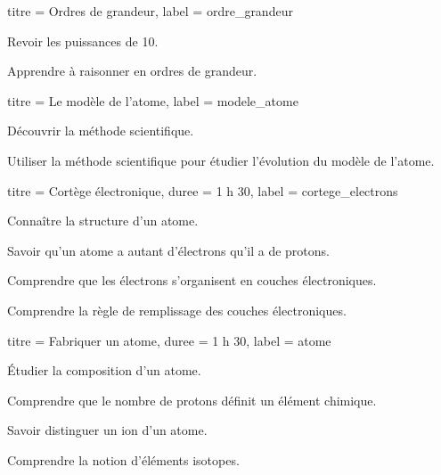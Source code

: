 \begin{boiteCodeTex}{}
  \setcounter{activiteNum}{0}
  \setcounter{TPNum}{0}
  \begin{multicols}{2}
    \begin{activite}{titre = Ordres de grandeur, label = ordre_grandeur}
      \begin{objectifs}  
        \item Revoir les puissances de 10.
        \item Apprendre à raisonner en ordres de grandeur.
      \end{objectifs}
    \end{activite}
    \begin{TP}{titre = Le modèle de l'atome, label = modele_atome}
      \begin{objectifs}
          \item Découvrir la méthode scientifique.
          \item Utiliser la méthode scientifique pour étudier l'évolution du modèle de l'atome.
      \end{objectifs}
    \end{TP}
  \end{multicols}
  \begin{multicols}{2}
    \begin{activite}{titre = Cortège électronique, duree = 1 h 30, label = cortege_electrons}
      \begin{prerequis}
        \item Connaître la structure d'un atome.
        \item Savoir qu'un atome a autant d'électrons qu'il a de protons.
      \end{prerequis}
      \begin{objectifs}
        \item Comprendre que les électrons s'organisent en couches électroniques.
        \item Comprendre la règle de remplissage des couches électroniques.
      \end{objectifs}
    \end{activite}
    \begin{TP}{titre = Fabriquer un atome, duree = 1 h 30, label = atome}
      \begin{objectifs}
        \item Étudier la composition d'un atome.
        \item Comprendre que le nombre de protons définit un élément chimique.
        \item Savoir distinguer un ion d'un atome.
        \item Comprendre la notion d'éléments isotopes.
      \end{objectifs}
    \end{TP}
  \end{multicols}


\end{boiteCodeTex}

